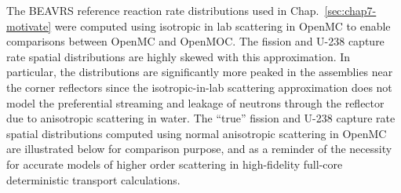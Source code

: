 \begin{appendices}
The \ac{BEAVRS} reference reaction rate distributions used in Chap.~\ref{sec:chap7-motivate} were computed using isotropic in lab scattering in OpenMC to enable comparisons between OpenMC and OpenMOC. The fission and U-238 capture rate spatial distributions are highly skewed with this approximation. In particular, the distributions are significantly more peaked in the assemblies near the corner reflectors since the isotropic-in-lab scattering approximation does not model the preferential streaming and leakage of neutrons through the reflector due to anisotropic scattering in water. The ``true'' fission and U-238 capture rate spatial distributions computed using normal anisotropic scattering in OpenMC are illustrated below for comparison purpose, and as a reminder of the necessity for accurate models of higher order scattering in high-fidelity full-core deterministic transport calculations.


\end{appendices}
